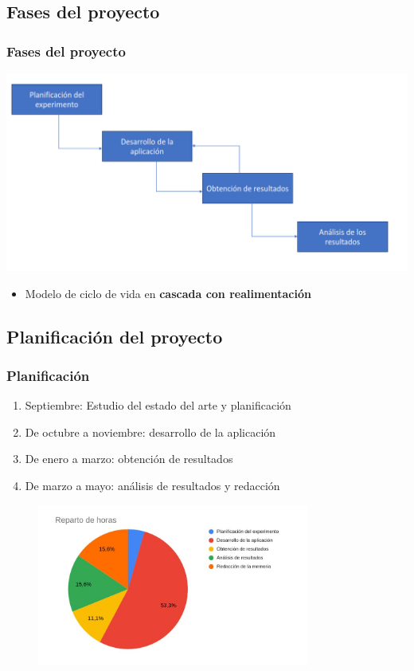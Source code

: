 \documentclass{beamer}
\begin{document}
\subsection{Fases del proyecto}
\begin{frame}
\frametitle{Fases del proyecto}	
\includegraphics[width=\linewidth]{diagrama-fases}
\begin{itemize}
	\item Modelo de ciclo de vida en \textbf{cascada con realimentación}
\end{itemize}

\end{frame}

\subsection{Planificación del proyecto}

\begin{frame}
\frametitle{Planificación}


\begin{enumerate}
	\item Septiembre: Estudio del estado del arte y planificación
	\item De octubre a noviembre: desarrollo de la aplicación
	\item De enero a marzo: obtención de resultados
	\item De marzo a mayo: análisis de resultados y redacción
\end{enumerate}
\begin{figure}
	\centering
	\includegraphics[width=0.8\textwidth]{horas}
\end{figure}


\end{frame}
\end{document}
